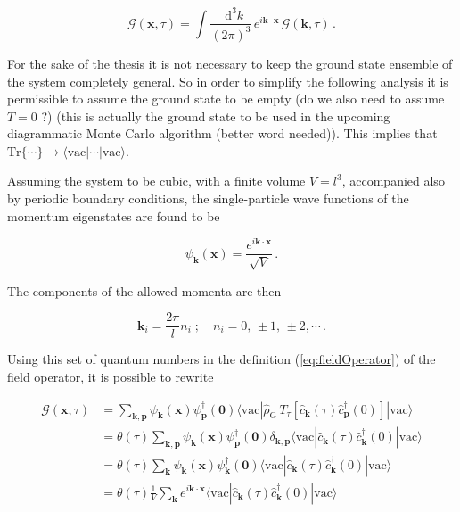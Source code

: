 \documentclass[12pt]{report}
\renewcommand{\vec}[1]{\boldsymbol{\mathbf{#1}}}                        %
\newcommand*\diff{\mathop{}\!\mathrm{d}}
\newcommand{\Gt}{\mathcal{G}}
\newcommand{\question}[1]{{\leavevmode\color{question}#1}}
\newcommand{\todo}[1]{{\leavevmode\color{todo}#1}}
\begin{document}
\begin{equation}
	\label{eq:defGpt}
	\Gt (\vec x, \tau) = \int \frac{\diff^3 k}{(2 \pi)^3} \,  e^{i \vec k \cdot \vec x} \, \Gt (\vec k, \tau) \,.
\end{equation}

For the sake of the thesis it is not necessary to keep the ground state ensemble of the system completely general. So in order to simplify the following analysis it is permissible to assume the ground state to be empty \question{(do we also need to assume $ T = 0 $ ?)} (this is actually the ground state to be used in the upcoming diagrammatic Monte Carlo algorithm \todo{(better word needed)}). This implies that $ \text{Tr}\{ \cdots \} \rightarrow \langle \text{vac} | \cdots | \text{vac} \rangle $.


Assuming the system to be cubic, with a finite volume $ V = l^3 $, accompanied also by periodic boundary conditions, the single-particle wave functions of the momentum eigenstates are found to be

\begin{equation}
	\psi_{\vec k} (\vec x) = \frac{e^{i \vec k \cdot \vec x}}{\sqrt V} \,.
\end{equation}

The components of the allowed momenta are then

\begin{equation}
	\vec k_i = \frac{2\pi}{l} n_i
	\; ; \quad 
	n_i = 0, \, \pm 1, \, \pm 2, \cdots \,.
\end{equation}

Using this set of quantum numbers in the definition (\ref{eq:fieldOperator}) of the field operator, it is possible to rewrite

\begin{equation}
	\label{eq:Gxt2Gpt}
	\begin{split}
		\Gt (\vec x, \tau)
		&= \sum_{\vec k, \vec p} \psi_{\vec k}(\vec x) \psi^\dagger_{\vec p}(\vec 0) \langle \text{vac} | \hat \rho_\text{G} \, T_\tau [\hat c_{\vec k}(\tau) \hat c^\dagger_{\vec p}(0)] | \text{vac} \rangle \\
		&= \theta(\tau) \sum_{\vec k, \vec p} \psi_{\vec k}(\vec x) \psi^\dagger_{\vec p}(\vec 0) \delta_{\vec k, \vec p} \langle \text{vac} | \hat c_{\vec k}(\tau) \hat c^\dagger_{\vec k}(0) | \text{vac} \rangle \\
		&= \theta(\tau) \sum_{\vec k} \psi_{\vec k}(\vec x) \psi^\dagger_{\vec k}(\vec 0) \langle \text{vac} | \hat c_{\vec k}(\tau) \hat c^\dagger_{\vec k}(0) | \text{vac} \rangle \\
		&= \theta(\tau) \frac{1}{V} \sum_{\vec k} e^{i \vec k \cdot \vec x} \langle \text{vac} | \hat c_{\vec k}(\tau) \hat c^\dagger_{\vec k}(0) | \text{vac} \rangle \\
	\end{split}
\end{equation}
\end{document}
